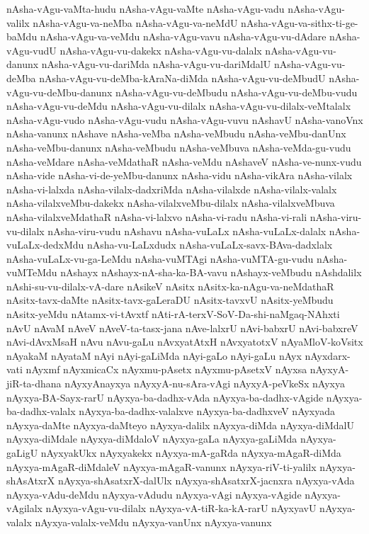 {nAsha-vAgu-vaMta-hudu
nAsha-vAgu-vaMte
nAsha-vAgu-vadu
nAsha-vAgu-valilx
nAsha-vAgu-va-neMba
nAsha-vAgu-va-neMdU
nAsha-vAgu-va-sithx-ti-ge-baMdu
nAsha-vAgu-va-veMdu
nAsha-vAgu-vavu
nAsha-vAgu-vu-dAdare
nAsha-vAgu-vudU
nAsha-vAgu-vu-dakekx
nAsha-vAgu-vu-dalalx
nAsha-vAgu-vu-danunx
nAsha-vAgu-vu-dariMda
nAsha-vAgu-vu-dariMdalU
nAsha-vAgu-vu-deMba
nAsha-vAgu-vu-deMba-kAraNa-diMda
nAsha-vAgu-vu-deMbudU
nAsha-vAgu-vu-deMbu-danunx
nAsha-vAgu-vu-deMbudu
nAsha-vAgu-vu-deMbu-vudu
nAsha-vAgu-vu-deMdu
nAsha-vAgu-vu-dilalx
nAsha-vAgu-vu-dilalx-veMtalalx
nAsha-vAgu-vudo
nAsha-vAgu-vudu
nAsha-vAgu-vuvu
nAshavU
nAsha-vanoVnx
nAsha-vanunx
nAshave
nAsha-veMba
nAsha-veMbudu
nAsha-veMbu-danUnx
nAsha-veMbu-danunx
nAsha-veMbudu
nAsha-veMbuva
nAsha-veMda-gu-vudu
nAsha-veMdare
nAsha-veMdathaR
nAsha-veMdu
nAshaveV
nAsha-ve-nunx-vudu
nAsha-vide
nAsha-vi-de-yeMbu-danunx
nAsha-vidu
nAsha-vikAra
nAsha-vilalx
nAsha-vi-lalxda
nAsha-vilalx-dadxriMda
nAsha-vilalxde
nAsha-vilalx-valalx
nAsha-vilalxveMbu-dakekx
nAsha-vilalxveMbu-dilalx
nAsha-vilalxveMbuva
nAsha-vilalxveMdathaR
nAsha-vi-lalxvo
nAsha-vi-radu
nAsha-vi-rali
nAsha-viru-vu-dilalx
nAsha-viru-vudu
nAshavu
nAsha-vuLaLx
nAsha-vuLaLx-dalalx
nAsha-vuLaLx-dedxMdu
nAsha-vu-LaLxdudx
nAsha-vuLaLx-savx-BAva-dadxlalx
nAsha-vuLaLx-vu-ga-LeMdu
nAsha-vuMTAgi
nAsha-vuMTA-gu-vudu
nAsha-vuMTeMdu
nAshayx
nAshayx-nA-sha-ka-BA-vavu
nAshayx-veMbudu
nAshdalilx
nAshi-su-vu-dilalx-vA-dare
nAsikeV
nAsitx
nAsitx-ka-nAgu-va-neMdathaR
nAsitx-tavx-daMte
nAsitx-tavx-gaLeraDU
nAsitx-tavxvU
nAsitx-yeMbudu
nAsitx-yeMdu
nAtamx-vi-tAvxtf
nAti-rA-terxV-SoV-Da-shi-naMgaq-NAhxti
nAvU
nAvaM
nAveV
nAveV-ta-tasx-jana
nAve-lalxrU
nAvi-babxrU
nAvi-babxreV
nAvi-dAvxMsaH
nAvu
nAvu-gaLu
nAvxyatAtxH
nAvxyatotxV
nAyaMloV-koVsitx
nAyakaM
nAyataM
nAyi
nAyi-gaLiMda
nAyi-gaLo
nAyi-gaLu
nAyx
nAyxdarx-vati
nAyxmf
nAyxmicaCx
nAyxmu-pAsetx
nAyxmu-pAsetxV
nAyxsa
nAyxyA-jiR-ta-dhana
nAyxyAnayxya
nAyxyA-nu-sAra-vAgi
nAyxyA-peVkeSx
nAyxya
nAyxya-BA-Sayx-rarU
nAyxya-ba-dadhx-vAda
nAyxya-ba-dadhx-vAgide
nAyxya-ba-dadhx-valalx
nAyxya-ba-dadhx-valalxve
nAyxya-ba-dadhxveV
nAyxyada
nAyxya-daMte
nAyxya-daMteyo
nAyxya-dalilx
nAyxya-diMda
nAyxya-diMdalU
nAyxya-diMdale
nAyxya-diMdaloV
nAyxya-gaLa
nAyxya-gaLiMda
nAyxya-gaLigU
nAyxyakUkx
nAyxyakekx
nAyxya-mA-gaRda
nAyxya-mAgaR-diMda
nAyxya-mAgaR-diMdaleV
nAyxya-mAgaR-vanunx
nAyxya-riV-ti-yalilx
nAyxya-shAsAtxrX
nAyxya-shAsatxrX-dalUlx
nAyxya-shAsatxrX-jacnxra
nAyxya-vAda
nAyxya-vAdu-deMdu
nAyxya-vAdudu
nAyxya-vAgi
nAyxya-vAgide
nAyxya-vAgilalx
nAyxya-vAgu-vu-dilalx
nAyxya-vA-tiR-ka-kA-rarU
nAyxyavU
nAyxya-valalx
nAyxya-valalx-veMdu
nAyxya-vanUnx
nAyxya-vanunx
}
